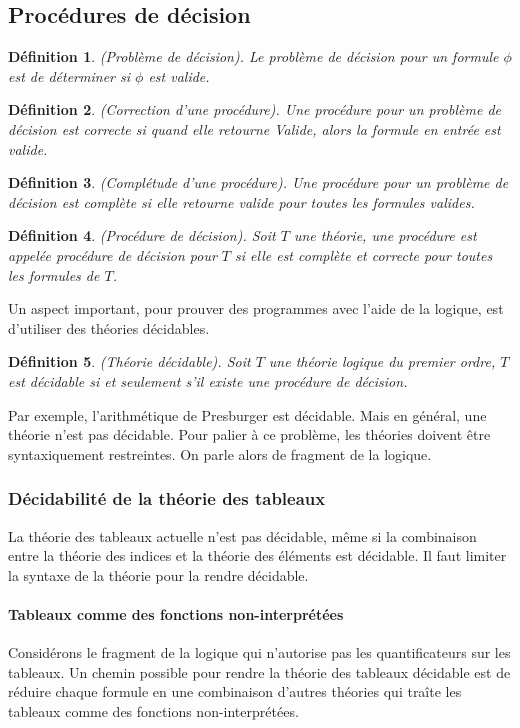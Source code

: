 \documentclass[11pt,openany]{article}
\newtheorem{definition}{D\'efinition}[subsection]
\begin{document}
			
 	\subsection{Proc\'edures de d\'ecision}
 	\begin{definition}
 	(Probl\`eme de d\'ecision). Le probl\`eme de d\'ecision pour un formule $\phi$ est de d\'eterminer si $\phi$ est valide.
 	\end{definition}
 	\begin{definition}
 	(Correction d'une proc\'edure). Une proc\'edure pour un probl\`eme de d\'ecision est correcte si quand elle retourne \textit{Valide}, alors la formule en entr\'ee est valide.
 	\end{definition}
 	\begin{definition}
 		(Compl\'etude d'une proc\'edure). Une proc\'edure pour un probl\`eme de d\'ecision est compl\`ete si elle retourne valide pour toutes les formules valides.
 	\end{definition}
 	\begin{definition}
 	(Proc\'edure de d\'ecision). Soit $T$ une th\'eorie, une proc\'edure est appel\'ee \textit{proc\'edure de d\'ecision pour $T$} si elle est compl\`ete et correcte pour toutes les formules de $T$. 
 	\end{definition} 	
 	Un aspect important, pour prouver des programmes avec l'aide de la logique, est d'utiliser des th\'eories d\'ecidables.
	\begin{definition}
	(Th\'eorie d\'ecidable). Soit $T$ une th\'eorie logique du premier ordre, $T$ est d\'ecidable si et seulement s'il existe une proc\'edure de d\'ecision.
	\end{definition}
	Par exemple, l'arithm\'etique de Presburger est d\'ecidable. Mais en g\'en\'eral, une th\'eorie n'est pas d\'ecidable. Pour palier \`a ce probl\`eme, les th\'eories doivent \^etre syntaxiquement restreintes. On parle alors de fragment de la logique.
			
	\subsubsection{D\'ecidabilit\'e de la th\'eorie des tableaux}
			
	La th\'eorie des tableaux actuelle n'est pas d\'ecidable, m\^eme si la combinaison entre la th\'eorie des indices et la th\'eorie des \'el\'ements est d\'ecidable. Il faut limiter la syntaxe de la th\'eorie pour la rendre d\'ecidable.
	\paragraph{Tableaux comme des fonctions non-interpr\'et\'ees}
	Consid\'erons le fragment de la logique qui n'autorise pas les quantificateurs sur les tableaux. Un chemin possible pour rendre la th\'eorie des tableaux d\'ecidable est de r\'eduire chaque formule en une combinaison d'autres th\'eories qui tra\^ite les tableaux comme des fonctions non-interpr\'et\'ees.
	
\end{document}
